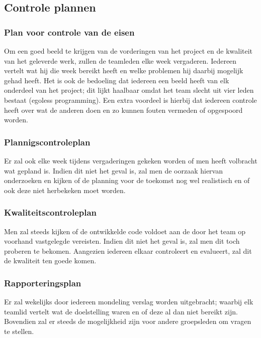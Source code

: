 \documentclass{article}
\begin{document}
\subsection{Controle plannen}


\subsubsection{Plan voor controle van de eisen}

Om een goed beeld te krijgen van de vorderingen van het project en de kwaliteit van het geleverde werk, zullen de teamleden elke week vergaderen. Iedereen vertelt wat hij die week bereikt heeft en welke  problemen hij daarbij mogelijk gehad heeft. Het is ook de bedoeling dat iedereen een beeld heeft van elk onderdeel van het project; dit lijkt haalbaar omdat het team slecht uit vier leden bestaat (egoless programming). Een extra voordeel is hierbij dat iedereen controle heeft over wat de anderen doen en zo kunnen fouten vermeden of opgespoord worden.

\subsubsection{Plannigscontroleplan}

Er zal ook elke week tijdens vergaderingen gekeken worden of men heeft volbracht wat gepland is. Indien dit niet het geval is, zal men de oorzaak hiervan onderzoeken en kijken of de planning voor de toekomst nog wel realistisch en of ook deze niet herbekeken moet worden.

\subsubsection{Kwaliteitscontroleplan}

Men zal steeds kijken of de ontwikkelde code voldoet aan de door het team op voorhand vastgelegde vereisten. Indien dit niet het geval is, zal men dit toch proberen te bekomen.
Aangezien iedereen elkaar controleert en evalueert, zal dit de kwaliteit ten goede komen.

\subsubsection{Rapporteringsplan}

Er zal wekelijks door iedereen mondeling verslag worden uitgebracht; waarbij elk teamlid vertelt wat de doelstelling waren en of deze al dan niet bereikt zijn. Bovendien zal er steeds de mogelijkheid zijn voor andere groepsleden om vragen te stellen.
\end{document}
